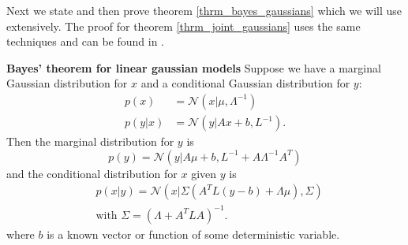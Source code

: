 Next we state and then prove theorem \ref{thrm_bayes_gaussians} which we will use extensively. The proof for theorem \ref{thrm_joint_gaussians} uses the same techniques and can be found in \cite{bishop}.
\begin{thrm}
\textbf{Bayes' theorem for linear gaussian models}
Suppose we have a marginal Gaussian distribution for $x$ and a conditional Gaussian distribution for $y$:
\begin{equation}
\begin{aligned}
p(x) &= \mathcal{N}(x|\mu,\Lambda^{-1}) \\
p(y|x) &= \mathcal{N}(y|Ax + b, L^{-1}).
\end{aligned}
\label{eq_bayes_gauss_suppose}
\end{equation} 
Then the marginal distribution for $y$ is 
\begin{equation}
p(y) = \mathcal{N}(y|A\mu + b, L^{-1}+A\Lambda^{-1}A^T)
\label{eq_bayes_gauss1}
\end{equation}
and the conditional distribution for $x$ given $y$ is
\begin{equation}
\begin{aligned}
&p(x|y) = \mathcal{N}(x|\Sigma(A^TL(y-b)+\Lambda\mu), \Sigma) \\
&\text{with } \Sigma = (\Lambda + A^TLA)^{-1}.
\end{aligned}
\label{eq_bayes_gauss2}
\end{equation}
\label{thrm_bayes_gaussians}
where $b$ is a known vector or function of some deterministic variable. 
\label{thrm_bayes_lin_gauss_mod}
\end{thrm}
